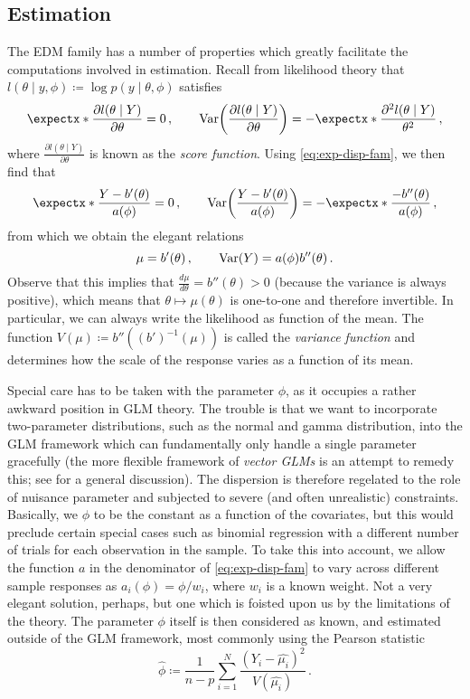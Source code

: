\documentclass[a4paper]{book}
\begin{document}
\subsection{Estimation}

The EDM family has a number of properties which greatly facilitate the computations involved in estimation. Recall from likelihood theory that $l(\theta \mid y, \phi) \coloneqq \log p(y \mid \theta, \phi)$ satisfies
\begin{equation} \label{eq:exp-var-likelihood}
  \expect{\frac{\partial l(\theta \mid Y)}{\partial \theta}} = 0 \,, \qquad \var{\frac{\partial l(\theta \mid Y)}{\partial \theta}} = -\expect{\frac{\partial^2 l(\theta \mid Y)}{\theta^2}} \,,
\end{equation}
where $\frac{\partial l(\theta \mid Y)}{\partial \theta}$ is known as the \emph{score function}. Using \cref{eq:exp-disp-fam}, we then find that
\begin{equation}
  \expect{\frac{Y - b'(\theta)}{a(\phi)}} = 0 \,, \qquad \var{\frac{Y - b'(\theta)}{a(\phi)}} = -\expect{\frac{-b''(\theta)}{a(\phi)}} \,,
\end{equation}
from which we obtain the elegant relations
\begin{equation}
  \mu = b'(\theta) \,, \qquad \var{Y} = a(\phi) b''(\theta) \,.
\end{equation}
Observe that this implies that $\frac{d \mu}{d \theta} = b''(\theta) > 0$ (because the variance is always positive), which means that $\theta \mapsto \mu(\theta)$ is one-to-one and therefore invertible. In particular, we can always write the likelihood as function of the mean. The function $V(\mu) \coloneqq b''((b')^{-1}(\mu))$ is called the \emph{variance function} and determines how the scale of the response varies as a function of its mean.

Special care has to be taken with the parameter $\phi$, as it occupies a rather awkward position in GLM theory. The trouble is that we want to incorporate two-parameter distributions, such as the normal and gamma distribution, into the GLM framework which can fundamentally only handle a single parameter gracefully (the more flexible framework of \emph{vector GLMs} is an attempt to remedy this; see \cite[Chapter 2]{yee} for a general discussion). The dispersion is therefore regelated to the role of nuisance parameter and subjected to severe (and often unrealistic) constraints. Basically, we $\phi$ to be the constant as a function of the covariates, but this would preclude certain special cases such as binomial regression with a different number of trials for each observation in the sample. To take this into account, we allow the function $a$ in the denominator of \cref{eq:exp-disp-fam} to vary across different sample responses as $a_i(\phi) = \phi / w_i$, where $w_i$ is a known weight. Not a very elegant solution, perhaps, but one which is foisted upon us by the limitations of the theory. The parameter $\phi$ itself is then considered as known, and estimated outside of the GLM framework, most commonly using the Pearson statistic
\begin{equation}
  \widehat{\phi} \coloneqq \frac{1}{n - p} \sum_{i = 1}^N \frac{(Y_i - \widehat{\mu_i})^2}{V(\widehat{\mu_i})} \,.
\end{equation}
\end{document}

